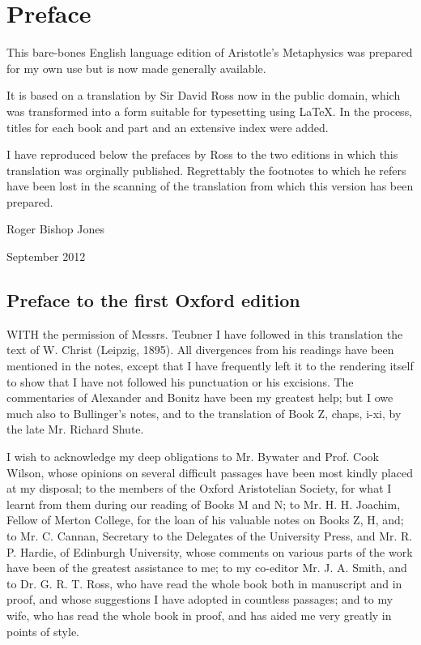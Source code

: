 \pagebreak

\chapter*{Preface}

This bare-bones English language edition of Aristotle's Metaphysics was prepared for my own use but is now made generally available.

It is based on a translation by Sir David Ross now in the public domain, which was transformed into a form suitable for typesetting using {\LaTeX}.
In the process, titles for each book and part and an extensive index were added.

I have reproduced below the prefaces by Ross to the two editions in which this translation was orginally published.
Regrettably the footnotes to which he refers have been lost in the scanning of the translation from which this version has been prepared.


\vspace{0.5in} 

Roger Bishop Jones

\vspace{0.05in} 

September 2012

\section*{Preface to the first Oxford edition} 

WITH the permission of Messrs. Teubner I have followed in 
this translation the text of W. Christ (Leipzig, 1895). All 
divergences from his readings have been mentioned in the 
notes, except that I have frequently left it to the rendering 
itself to show that I have not followed his punctuation or his 
excisions. The commentaries of Alexander and Bonitz have 
been my greatest help; but I owe much also to Bullinger's 
notes, and to the translation of Book Z, chaps, i-xi, by 
the late Mr. Richard Shute. 

I wish to acknowledge my deep obligations to Mr. Bywater 
and Prof. Cook Wilson, whose opinions on several difficult passages
have been most kindly placed at my disposal; to the members
of the Oxford Aristotelian Society, for what I learnt from 
them during our reading of Books M and N; to Mr. H. H. 
Joachim, Fellow of Merton College, for the loan of his valuable 
notes on Books Z, H, and; to Mr. C. Cannan, Secretary to 
the Delegates of the University Press, and Mr. R. P. Hardie, of 
Edinburgh University, whose comments on various parts of 
the work have been of the greatest assistance to me; to my 
co-editor Mr. J. A. Smith, and to Dr. G. R. T. Ross, who have 
read the whole book both in manuscript and in proof, and 
whose suggestions I have adopted in countless passages; and 
to my wife, who has read the whole book in proof, and has 
aided me very greatly in points of style. 

